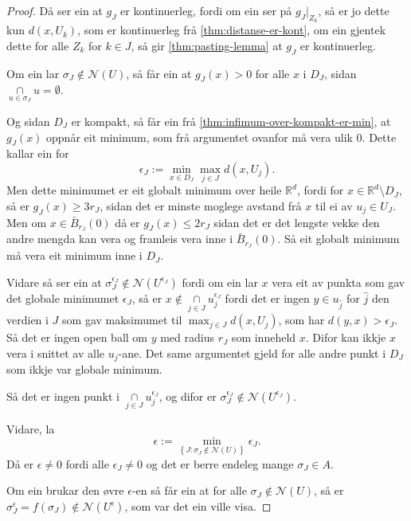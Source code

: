 \documentclass[a4paper, 12pt, norsk]{article}
\theoremstyle{plain}
\theoremstyle{definition}
\newcommand{\Rb}{\mathbb{R}}
\newcommand{\Nc}{\mathcal{N}}
\newcommand{\intersect}{ \mathop{\cap}\limits }
\newcommand{\set}[1]{ \left\{ #1 \right\} } %
\begin{document}
\begin{proof}
	Då ser ein at \( g_J \) er kontinuerleg, fordi om ein ser på \( g_J|_{Z_k} \), så er jo dette kun \( d(x, U_k) \), som er kontinuerleg frå \autoref{thm:distanse-er-kont}, om ein gjentek dette for alle \( Z_k \) for \( k \in J \), så gir \autoref{thm:pasting-lemma} at \( g_J \) er kontinuerleg.

	Om ein lar \( \sigma_J \not\in \Nc(U) \), så får ein at \( g_J(x) > 0 \) for alle \( x \) i \( D_J \), sidan \( \intersect_{u \in \sigma_J} u = \emptyset \).

	Og sidan \( D_J \) er kompakt, så får ein frå \autoref{thm:infimum-over-kompakt-er-min}, at \( g_J(x) \) oppnår eit minimum, som frå argumentet ovanfor må vera ulik \( 0 \). Dette kallar ein for
	\[
		\epsilon_J := \min_{x \in D_J} \max_{j \in J} d(x, U_j).
	\]
	Men dette minimumet er eit globalt minimum over heile \( \Rb^d \), fordi for \( x \in \Rb^d \setminus D_J \), så er \( g_J(x) \geq 3r_J \), sidan det er minste moglege avstand frå \( x \) til ei av \( u_j \in U_J \). Men om \( x \in \bar{B}_{r_J}(0) \) då er \( g_J(x) \leq 2r_J \) sidan det er det lengste vekke den andre mengda kan vera og framleis vera inne i \( \bar{B}_{r_J}(0) \). Så eit globalt minimum må vera eit minimum inne i \( D_J \).

	Vidare så ser ein at \( \sigma_J^{\epsilon_J} \not\in \Nc(U^{\epsilon_J}) \) fordi om ein lar \( x \) vera eit av punkta som gav det globale minimumet \( \epsilon_J \), så er \( x \not\in \intersect_{j \in J} u_j^{\epsilon_J} \) fordi det er ingen \( y \in  u_{\hat{j}} \) for \( \hat{j} \) den verdien i \( J \) som gav maksimumet til \( \max_{j \in J} d(x, U_j) \), som har \( d(y, x) > \epsilon_J \). Så det er ingen open ball om \( y \) med radius \( r_J \) som inneheld \( x \). Difor kan ikkje \( x \) vera i snittet av alle \( u_j \)-ane. Det same argumentet gjeld for alle andre punkt i \( D_J \) som ikkje var globale minimum.
	
	Så det er ingen punkt i \( \intersect_{j \in J} u_j^{\epsilon_J} \), og difor er \( \sigma_J^{\epsilon_J} \not\in \Nc(U^{\epsilon_J}) \).

	Vidare, la
	\[
		\epsilon := \min_{\set{J : \sigma_J \not\in \Nc(U)}} \epsilon_J.
	\]
	Då er \( \epsilon \neq 0 \) fordi alle \( \epsilon_J \neq 0 \) og det er berre endeleg mange \( \sigma_J \in A \).

	Om ein brukar den øvre \( \epsilon \)-en så får ein at for alle \( \sigma_J \not\in \Nc(U) \), så er \( \sigma_J^{\epsilon}=f(\sigma_J) \not\in \Nc(U^{\epsilon}) \), som var det ein ville visa.
\end{proof}
\end{document}
